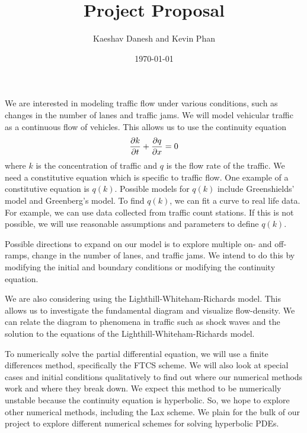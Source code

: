 \documentclass[12pt]{article}
\title{Project Proposal}
\author{Kaeshav Danesh and Kevin Phan}
\date{\today}
\begin{document}
	
	\maketitle
    \vspace{-7mm}
    We are interested in modeling traffic flow under various conditions, such as changes in the number of lanes and traffic jams. We will model vehicular traffic as a continuous flow of vehicles. This allows us to use the continuity equation 
    \begin{equation}
        \pdv{k}{t} + \pdv{q}{x} = 0
    \end{equation}
    where $k$ is the concentration of traffic and $q$ is the flow rate of the traffic. We need a constitutive equation which is specific to traffic flow. One example of a constitutive equation is $q(k)$. Possible models for $q(k)$ include Greenshields' model and Greenberg's model. To find $q(k)$, we can fit a curve to real life data. For example, we can use data collected from traffic count stations. If this is not possible, we will use reasonable assumptions and parameters to define $q(k)$. 
    
    Possible directions to expand on our model is to explore multiple on- and off-ramps, change in the number of lanes, and traffic jams. We intend to do this by modifying the initial and boundary conditions or modifying the continuity equation. 
    
    We are also considering using the Lighthill-Whiteham-Richards model. This allows us to investigate the fundamental diagram and visualize flow-density. We can relate the diagram to phenomena in traffic such as shock waves and the solution to the equations of the Lighthill-Whiteham-Richards model.

    To numerically solve the partial differential equation, we will use a finite differences method, specifically the FTCS scheme.  We will also look at special cases and initial conditions qualitatively to find out where our numerical methods work and where they break down. We expect this method to be numerically unstable because the continuity equation is hyperbolic. So, we hope to explore other numerical methods, including the Lax scheme. We plain for the bulk of our project to explore different numerical schemes for solving hyperbolic PDEs.
\end{document}
